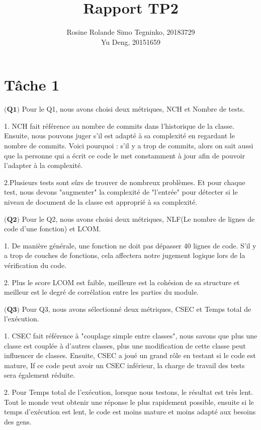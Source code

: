 \documentclass{article}
\title{Rapport TP2}
\author{Rosine Rolande Simo Tegninko, 20183729\\
Yu Deng, 20151659}
\date{}
\begin{document}
\maketitle

\section*{Tâche 1}

\item$\textbf{(Q1)}$
Pour le Q1, nous avons choisi deux métriques, NCH et Nombre de tests.

1.	NCH fait référence au nombre de commits dans l'historique de la classe. Ensuite, nous pouvons juger s'il est adapté à sa complexité en regardant le nombre de commits. Voici pourquoi : s'il y a trop de commits, alors on sait aussi que la personne qui a écrit ce code le met constamment à jour afin de pouvoir l'adapter à la complexité.

2.Plusieurs tests sont sûrs de trouver de nombreux problèmes. Et pour chaque test, nous devons "augmenter" la complexité de "l'entrée" pour détecter si le niveau de document de la classe est approprié à sa complexité.


\item $\textbf{(Q2)}$
Pour le Q2, nous avons choisi deux métriques, NLF(Le nombre de lignes de code d’une fonction) et LCOM.

1. De manière générale, une fonction ne doit pas dépasser 40 lignes de code. S'il y a trop de couches de fonctions, cela affectera notre jugement logique lors de la vérification du code.

2. Plus le score LCOM est faible, meilleure est la cohésion de sa structure et meilleur est le degré de corrélation entre les parties du module.


\item$\textbf{(Q3)}$
Pour Q3, nous avons sélectionné deux métriques, CSEC et Temps total de l’exécution.


1. CSEC fait référence à "couplage simple entre classes", nous savons que plus une classe est couplée à d'autres classes, plus une modification de cette classe peut influencer de classes. Ensuite, CSEC a joué un grand rôle en testant si le code est mature, If ce code peut avoir un CSEC inférieur, la charge de travail des tests sera également réduite.

2. Pour Temps total de l’exécution, lorsque nous testons, le résultat est très lent. Tout le monde veut obtenir une réponse le plus rapidement possible, ensuite si le temps d'exécution est lent, le code est moins mature et moins adapté aux besoins des gens.
\end{document}
